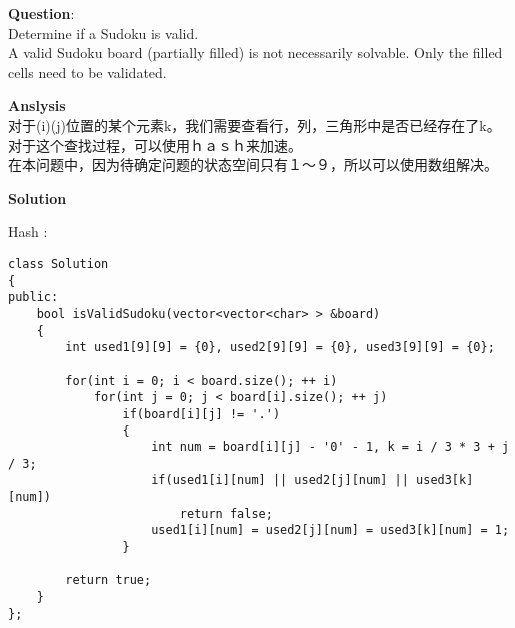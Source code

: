     
\begin{description}
    \item{\textbf{Question}}:\\%
		Determine if a Sudoku is valid.\\
		A valid Sudoku board (partially filled) is not necessarily solvable. Only the filled cells need to be validated.

    \item{\textbf{Anslysis}}\\
		对于(i)(j)位置的某个元素k，我们需要查看行，列，三角形中是否已经存在了k。对于这个查找过程，可以使用ｈａｓｈ来加速。\\
		在本问题中，因为待确定问题的状态空间只有１～９，所以可以使用数组解决。\\

    \item{\textbf{Solution}}\\
	\item{Hash} : \\
		\begin{lstlisting}
class Solution
{
public:
    bool isValidSudoku(vector<vector<char> > &board)
    {
        int used1[9][9] = {0}, used2[9][9] = {0}, used3[9][9] = {0};

        for(int i = 0; i < board.size(); ++ i)
            for(int j = 0; j < board[i].size(); ++ j)
                if(board[i][j] != '.')
                {
                    int num = board[i][j] - '0' - 1, k = i / 3 * 3 + j / 3;
                    if(used1[i][num] || used2[j][num] || used3[k][num])
                        return false;
                    used1[i][num] = used2[j][num] = used3[k][num] = 1;
                }

        return true;
    }
};
		\end{lstlisting}

\end{description}

